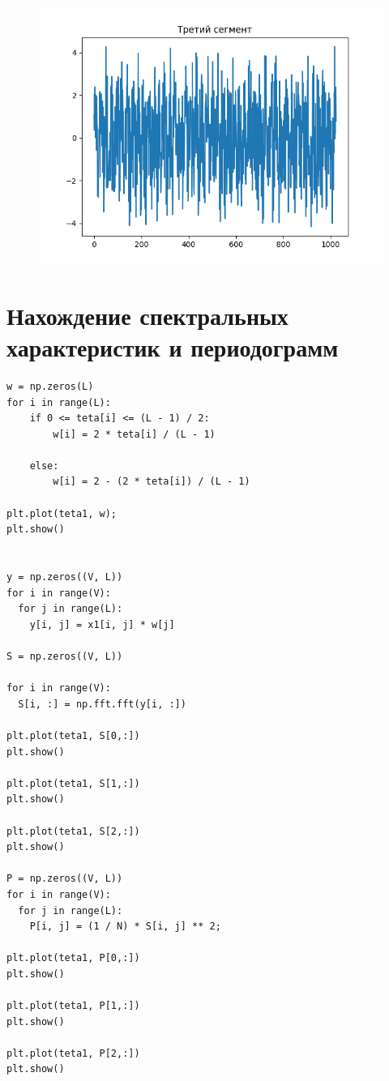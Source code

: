 \documentclass[12pt]{article}
\begin{document}
\begin{figure}[!htb]
\centering
\includegraphics[scale=1.00]{third_seg.png}
\caption{}
\label{}
\end{figure}

\section{ Нахождение спектральных характеристик и периодограмм}

\begin{lstlisting}
w = np.zeros(L)
for i in range(L):
    if 0 <= teta[i] <= (L - 1) / 2:
        w[i] = 2 * teta[i] / (L - 1)

    else:
        w[i] = 2 - (2 * teta[i]) / (L - 1)

plt.plot(teta1, w);
plt.show()


y = np.zeros((V, L))
for i in range(V):
  for j in range(L):
    y[i, j] = x1[i, j] * w[j]

S = np.zeros((V, L))

for i in range(V):
  S[i, :] = np.fft.fft(y[i, :])

plt.plot(teta1, S[0,:])
plt.show()

plt.plot(teta1, S[1,:])
plt.show()

plt.plot(teta1, S[2,:])
plt.show()

P = np.zeros((V, L))
for i in range(V):
  for j in range(L):
    P[i, j] = (1 / N) * S[i, j] ** 2;

plt.plot(teta1, P[0,:])
plt.show()

plt.plot(teta1, P[1,:])
plt.show()

plt.plot(teta1, P[2,:])
plt.show()
\end{lstlisting}
\end{document}
